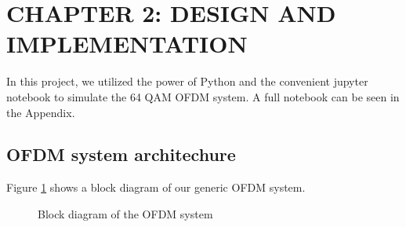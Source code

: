 \section*{CHAPTER 2: DESIGN AND IMPLEMENTATION}
\setcounter{section}{2}
\setcounter{subsection}{0}
\setcounter{figure}{0}
\setcounter{table}{0}

In this project, we utilized the power of Python and the convenient jupyter notebook to simulate the 64 QAM OFDM system. A full notebook can be seen in the Appendix.

\subsection{OFDM system architechure}
Figure \ref{diagram} shows a block diagram of our generic OFDM system.

\begin{figure}[htbp]
    \centering
    
    \caption{Block diagram of the OFDM system}
    \label{diagram}
\end{figure}


